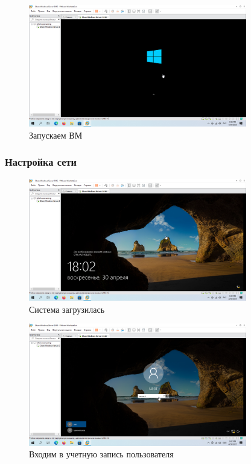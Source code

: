 \documentclass[a4paper]{article}
\begin{document}
  \begin{figure}[H]
    \centering
    \includegraphics[width=0.85\textwidth]{Screenshot_15}
    \caption{Запускаем ВМ}
    \label{img:15}
  \end{figure}

  \subsubsection{Настройка сети}

  \begin{figure}[H]
    \centering
    \includegraphics[width=0.85\textwidth]{Screenshot_16}
    \caption{Система загрузилась}
    \label{img:16}
  \end{figure}

  \begin{figure}[H]
    \centering
    \includegraphics[width=0.85\textwidth]{Screenshot_17}
    \caption{Входим в учетную запись пользователя}
    \label{img:17}
  \end{figure}
\end{document}
